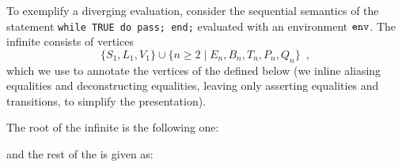 
To exemplify a diverging evaluation, consider the sequential semantics
of the statement \verb|while TRUE do pass; end;| evaluated with
an environment $\env$.
The infinite \derivationtreeterm{} consists of vertices
\[
\{S_1, L_1, V_1\} \cup \{n \geq 2 \;|\; E_n, B_n, T_n, P_n, Q_n\} \enspace,
\]
which we use to annotate the vertices of the \derivationtreeterm{} defined below
(we inline aliasing equalities and deconstructing equalities,
leaving only asserting equalities and transitions, to simplify the presentation).

The root of the infinite \derivationtreeterm{} is the following one:
\begin{mathpar}
\end{mathpar}

and the rest of the \derivationtreeterm{} is given as:
\begin{mathpar}
\end{mathpar}

